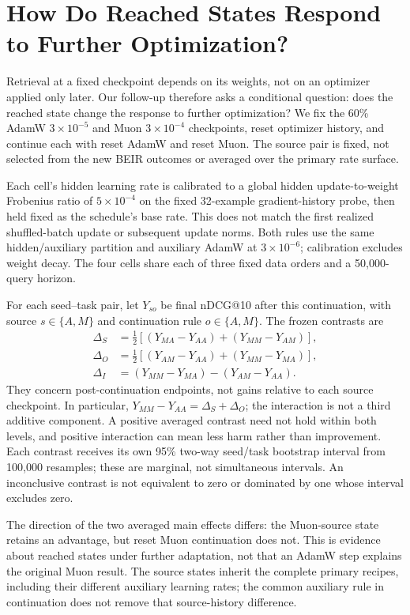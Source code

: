 \documentclass[11pt]{article}
\begin{document}
\section{How Do Reached States Respond to Further Optimization?}

Retrieval at a fixed checkpoint depends on its weights, not on an optimizer applied only later.
Our follow-up therefore asks a conditional question: does the reached state change the response to
further optimization? We fix the 60\% AdamW $3\!\times\!10^{-5}$ and Muon $3\!\times\!10^{-4}$
checkpoints, reset optimizer history, and continue each with reset AdamW and reset Muon. The source
pair is fixed, not selected from the new BEIR outcomes or averaged over the primary rate surface.

Each cell's hidden learning rate is calibrated to a global hidden update-to-weight Frobenius ratio
of $5\!\times\!10^{-4}$ on the fixed 32-example gradient-history probe, then held fixed as the
schedule's base rate. This does not match the first realized shuffled-batch update or subsequent
update norms. Both rules use the same hidden/auxiliary partition and auxiliary AdamW at
$3\!\times\!10^{-6}$; calibration excludes weight decay. The four cells share each of three fixed
data orders and a 50,000-query horizon.

For each seed--task pair, let $Y_{so}$ be final nDCG@10 after this continuation, with source
$s\in\{A,M\}$ and continuation rule $o\in\{A,M\}$. The frozen contrasts are
\begin{align}
\Delta_S &= \tfrac12[(Y_{MA}-Y_{AA})+(Y_{MM}-Y_{AM})],\\
\Delta_O &= \tfrac12[(Y_{AM}-Y_{AA})+(Y_{MM}-Y_{MA})],\\
\Delta_I &= (Y_{MM}-Y_{MA})-(Y_{AM}-Y_{AA}).
\end{align}
They concern post-continuation endpoints, not gains relative to each source checkpoint. In
particular, $Y_{MM}-Y_{AA}=\Delta_S+\Delta_O$; the interaction is not a third additive component.
A positive averaged contrast need not hold within both levels, and positive interaction can mean
less harm rather than improvement. Each contrast receives its own 95\% two-way seed/task bootstrap
interval from 100,000 resamples; these are marginal, not simultaneous intervals. An inconclusive
contrast is not equivalent to zero or dominated by one whose interval excludes zero.

\StateOperatorMechanismFinding

The direction of the two averaged main effects differs: the Muon-source state retains an
advantage, but reset Muon continuation does not. This is evidence about reached states under
further adaptation, not that an AdamW step explains the original Muon result. The source states
inherit the complete primary recipes, including their different auxiliary learning rates;
the common auxiliary rule in continuation does not remove that source-history difference.
\end{document}
